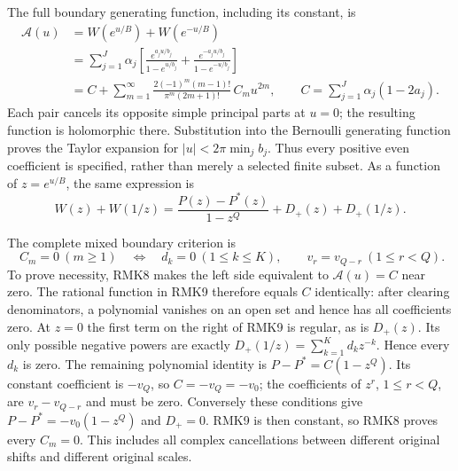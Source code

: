 The full boundary generating function, including its constant, is
\begin{equation}\tag{RMK8}
\begin{split}
 \mathcal A(u)
 &=W(e^{u/B})+W(e^{-u/B})\\
 &=\sum_{j=1}^J\alpha_j\left[
       \frac{e^{a_j u/b_j}}{1-e^{u/b_j}}
       +\frac{e^{-a_j u/b_j}}{1-e^{-u/b_j}}\right]\\
 &=C+\sum_{m=1}^\infty
        \frac{2(-1)^m(m-1)!}{\pi^m(2m+1)!}\,C_m u^{2m},
 \qquad C=\sum_{j=1}^J\alpha_j(1-2a_j).
\end{split}
\end{equation}
Each pair cancels its opposite simple principal parts at $u=0$;
the resulting function is holomorphic there. Substitution into the
Bernoulli generating function proves the Taylor expansion for
$|u|<2\pi\min_j b_j$. Thus every positive even coefficient is
specified, rather than merely a selected finite subset. As a
function of $z=e^{u/B}$, the same expression is
\begin{equation}\tag{RMK9}
 W(z)+W(1/z)
     =\frac{P(z)-P^*(z)}{1-z^Q}+D_+(z)+D_+(1/z).
\end{equation}

The complete mixed boundary criterion is
\begin{equation}\tag{RMK10}
 \boxed{\quad
 C_m=0\ (m\geq1)
 \quad\Longleftrightarrow\quad
 d_k=0\ (1\leq k\leq K),\qquad
 v_r=v_{Q-r}\ (1\leq r<Q).
 \quad}
\end{equation}
To prove necessity, RMK8 makes the left side equivalent to
$\mathcal A(u)=C$ near zero. The rational function in RMK9
therefore equals $C$ identically: after clearing denominators,
a polynomial vanishes on an open set and hence has all coefficients
zero. At $z=0$ the first term on the right of RMK9 is regular,
as is $D_+(z)$. Its only possible negative powers are exactly
$D_+(1/z)=\sum_{k=1}^K d_kz^{-k}$. Hence every $d_k$ is zero.
The remaining polynomial identity is
$P-P^*=C(1-z^Q)$. Its constant coefficient is $-v_Q$, so
$C=-v_Q=-v_0$; the coefficients of $z^r$, $1\leq r<Q$, are
$v_r-v_{Q-r}$ and must be zero. Conversely these conditions give
$P-P^*=-v_0(1-z^Q)$ and $D_+=0$. RMK9 is then constant, so
RMK8 proves every $C_m=0$. This includes all complex cancellations
between different original shifts and different original scales.

